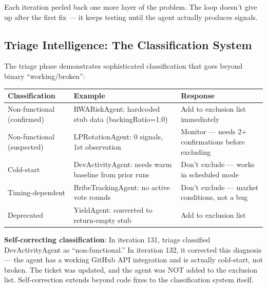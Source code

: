 \documentclass[11pt,a4paper]{article}
\newcounter{none} %
\begin{document}
Each iteration peeled back one more layer of the problem. The loop doesn't give up after the first fix --- it keeps testing until the agent actually produces signals.

\subsection{Triage Intelligence: The Classification System}\label{sec:triage-intelligence-the-classification-system}

The triage phase demonstrates sophisticated classification that goes beyond binary ``working/broken'':

{\def\LTcaptype{none} %
\begin{longtable}[]{@{}
  >{\raggedright\arraybackslash}p{}
  >{\raggedright\arraybackslash}p{}
  >{\raggedright\arraybackslash}p{}@{}}
\toprule\noalign{}
\begin{minipage}[b]{\linewidth}\raggedright
Classification
\end{minipage} & \begin{minipage}[b]{\linewidth}\raggedright
Example
\end{minipage} & \begin{minipage}[b]{\linewidth}\raggedright
Response
\end{minipage} \\
\midrule\noalign{}
\endhead
\bottomrule\noalign{}
\endlastfoot
Non-functional (confirmed) & RWARiskAgent: hardcoded stub data (backingRatio=1.0) & Add to exclusion list immediately \\
Non-functional (suspected) & LPRotationAgent: 0 signals, 1st observation & Monitor --- needs 2+ confirmations before excluding \\
Cold-start & DevActivityAgent: needs warm baseline from prior runs & Don't exclude --- works in scheduled mode \\
Timing-dependent & BribeTrackingAgent: no active vote rounds & Don't exclude --- market conditions, not a bug \\
Deprecated & YieldAgent: converted to return-empty stub & Add to exclusion list \\
\end{longtable}
}

\textbf{Self-correcting classification}: In iteration 131, triage classified DevActivityAgent as ``non-functional.'' In iteration 132, it corrected this diagnosis --- the agent has a working GitHub API integration and is actually cold-start, not broken. The ticket was updated, and the agent was NOT added to the exclusion list. Self-correction extends beyond code fixes to the classification system itself.
\end{document}
